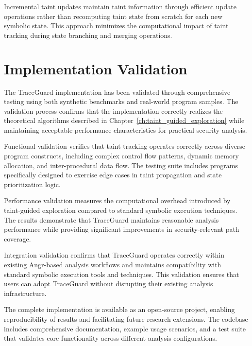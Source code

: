 Incremental taint updates maintain taint information through efficient update operations rather than recomputing taint state from scratch for each new symbolic state. This approach minimizes the computational impact of taint tracking during state branching and merging operations.

\section{Implementation Validation}\label{sec:implementation_validation}

The TraceGuard implementation has been validated through comprehensive testing using both synthetic benchmarks and real-world program samples. The validation process confirms that the implementation correctly realizes the theoretical algorithms described in Chapter~\ref{ch:taint_guided_exploration} while maintaining acceptable performance characteristics for practical security analysis.

Functional validation verifies that taint tracking operates correctly across diverse program constructs, including complex control flow patterns, dynamic memory allocation, and inter-procedural data flow. The testing suite includes programs specifically designed to exercise edge cases in taint propagation and state prioritization logic.

Performance validation measures the computational overhead introduced by taint-guided exploration compared to standard symbolic execution techniques. The results demonstrate that TraceGuard maintains reasonable analysis performance while providing significant improvements in security-relevant path coverage.

Integration validation confirms that TraceGuard operates correctly within existing Angr-based analysis workflows and maintains compatibility with standard symbolic execution tools and techniques. This validation ensures that users can adopt TraceGuard without disrupting their existing analysis infrastructure.

The complete implementation is available as an open-source project, enabling reproducibility of results and facilitating future research extensions. The codebase includes comprehensive documentation, example usage scenarios, and a test suite that validates core functionality across different analysis configurations.
